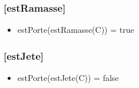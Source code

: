 \documentclass[11pt]{article}
\begin{document}
\subsubsection{[estRamasse]}
\label{sec-1.6.2}

\begin{itemize}

\item estPorte(estRamasse(C)) = true\\
\label{sec-1.6.2.1}


\end{itemize} %
\subsubsection{[estJete]}
\label{sec-1.6.3}

\begin{itemize}

\item estPorte(estJete(C)) = false\\
\label{sec-1.6.3.1}

\end{itemize} %
\end{document}
